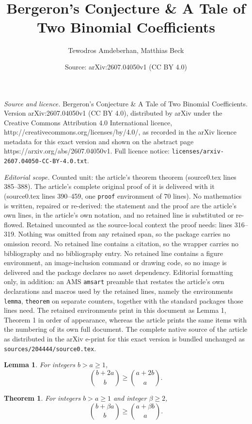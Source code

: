 \documentclass[10pt,a4paper]{amsart}
\title{Bergeron's Conjecture \& A Tale of Two Binomial Coefficients}
\author{Tewodros Amdeberhan, Matthias Beck}
\date{Source: arXiv:2607.04050v1 (CC BY 4.0)}
\newtheorem{lemma}{Lemma}
\newtheorem{theorem}{Theorem}
\begin{document}
\maketitle

\noindent\emph{Source and licence.} Bergeron's Conjecture \& A Tale of Two Binomial Coefficients. Version arXiv:2607.04050v1 (CC BY 4.0), distributed by arXiv under the Creative Commons Attribution 4.0 International licence, http://creativecommons.org/licenses/by/4.0/, as recorded in the arXiv licence metadata for this exact version and shown on the abstract page https://arxiv.org/abs/2607.04050v1. Full licence notice: \texttt{licenses/arxiv-2607.04050-CC-BY-4.0.txt}.\par\smallskip

\noindent\textit{Editorial scope.} Counted unit: the article's theorem theorem (source0.tex lines 385--388). The article's complete original proof of it is delivered with it (source0.tex lines 390--459, one \texttt{proof} environment of 70 lines). No mathematics is written, repaired or re-derived: the statement and the proof are the article's own lines, in the article's own notation, and no retained line is substituted or re-flowed.  Retained uncounted as the source-local context the proof needs: lines 316--319.  Nothing was omitted from any retained span, so the package carries no omission record.  No retained line contains a citation, so the wrapper carries no bibliography and no bibliography entry.  No retained line contains a figure environment, an image-inclusion command or drawing code, so no image is delivered and the package declares no asset dependency.  Editorial formatting only, in addition: an AMS \texttt{amsart} preamble that restates the article's own declarations and macros used by the retained lines, namely the environments \texttt{lemma}, \texttt{theorem} on separate counters, together with the standard packages those lines need.  The retained environments print in this document as Lemma 1, Theorem 1 in order of appearance, whereas the article prints the same items with the numbering of its own full document.  The complete native source of the article as distributed in the arXiv e-print for this exact version is bundled unchanged as \texttt{sources/204444/source0.tex}.
\begin{lemma} \label{lemma1}
For integers $b> a \ge 1$,
$$ \binom{b+2a}b \ge \binom{a+2b}{a}.$$
\end{lemma}

\begin{theorem}
For integers $b> a \ge 1$ and integer $\beta\geq2$, 
$$\binom{b+\beta a}b \ge \binom{a+\beta b}{a}.$$
\end{theorem}
\end{document}
